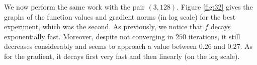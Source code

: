 \documentclass{article}
\begin{document}




We now perform the same work with the pair $(3, 128)$. Figure \ref{fig:32} gives the graphs of the function values and gradient norms (in log scale) for the best experiment, which was the second. As previously, we notice that $f$ decays exponentially fast. Moreover, despite not converging in $250$ iterations, it still decreases considerably and seems to approach a value between $0.26$ and $0.27$. As for the gradient, it decays first very fast and then linearly (on the log scale).\\
\end{document}
